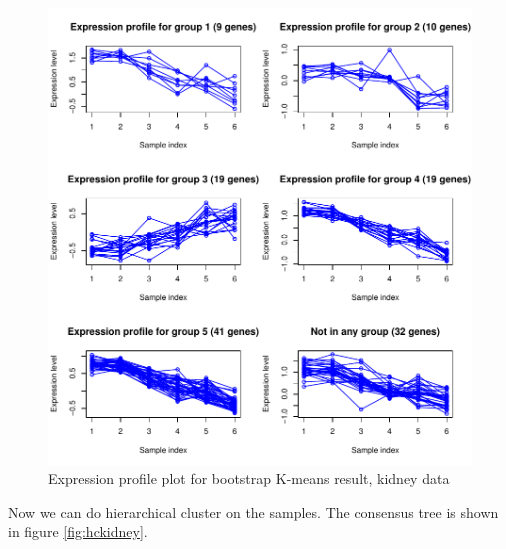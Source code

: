 \begin{enumerate}
\begin{figure}
\centering
\includegraphics{vgprofile}
\caption{Expression profile plot for bootstrap K-means result, kidney data}
\label{fig:vgprofile}
\end{figure}

Now we can do hierarchical cluster on the samples. The consensus tree 
is shown in figure \ref{fig:hckidney}.


\end{enumerate}
